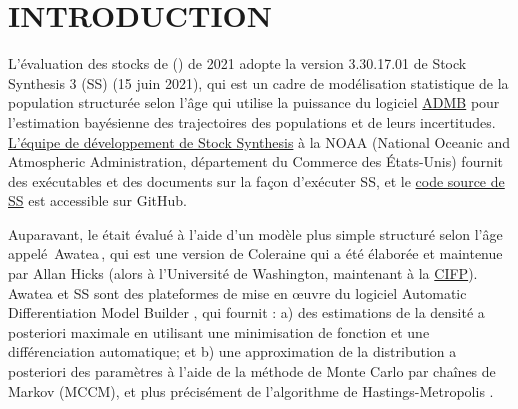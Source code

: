 \documentclass[11pt]{book}
\newcommand{\angL}{\guillemotleft\,}
\newcommand{\angR}{\,\guillemotright}
\begin{document}
\newcommand{\LH}{}%
\newcommand{\RH}{}%
\newcommand{\LF}{\spn{} 2021}
\newcommand{\RF}{Annexe~\thechapter ~-- \'{E}quations du mod\`{e}le}

\lhead{\LH}\rhead{\RH}\lfoot{\LF}\rfoot{\RF}

\newcommand{\nSims}{4\,000}
\newcommand{\nChains}{8}
\newcommand{\cSims}{500}
\newcommand{\cBurn}{250}
\newcommand{\cSamps}{250}
\newcommand{\Nmcmc}{2\,000}
\newcommand{\Nbase}{10\,000}

\newcommand{\numMCMC}{1\,000}
\newcommand{\sRate}{5\,000}
\newcommand{\nSamps}{1\,200}
\newcommand{\nBurn}{200}
\newcommand{\harvestMax}{0,401}
\newcommand{\harvestInc}{0,001}
\newcommand{\policyMax}{3\,000}
\newcommand{\policyInc}{500 (or 250)}
\newcommand{\currYear}{2022} %
\newcommand{\prevYear}{2021} %
\newcommand{\projYear}{2032} %

\section{INTRODUCTION}%

L'\'{e}valuation des stocks de \spn{} (\spc) de 2021 adopte la version 3.30.17.01 de Stock Synthesis 3 (SS) (15 juin 2021), qui est un cadre de mod\'{e}lisation statistique de la population structur\'{e}e selon l'\^{a}ge \citep{Methot-Wetzel:2013} qui utilise la puissance du logiciel \href{https://www.admb-project.org/}{ADMB} pour l'estimation bay\'{e}sienne des trajectoires des populations et de leurs incertitudes.
\href{https://vlab.noaa.gov/web/stock-synthesis}{L'\'{e}quipe de d\'{e}veloppement de Stock Synthesis} \`{a} la NOAA (National Oceanic and Atmospheric Administration, d\'{e}partement du Commerce des \'{E}tats-Unis) fournit des ex\'{e}cutables et des documents sur la fa\c{c}on d'ex\'{e}cuter SS, et le \href{https://github.com/nmfs-stock-synthesis/stock-synthesis}{code source de SS} est accessible sur GitHub.

Auparavant, le \spc{} \'{e}tait \'{e}valu\'{e} \`{a} l'aide d'un mod\`{e}le plus simple structur\'{e} selon l'\^{a}ge appel\'{e} \angL Awatea\angR{}, qui est une version de Coleraine \citep{Hilborn-etal:2003} qui a \'{e}t\'{e} \'{e}labor\'{e}e et maintenue par Allan Hicks (alors \`{a} l'Universit\'{e} de Washington, maintenant \`{a} la \href{https://www.iphc.int/}{CIFP}).
Awatea et SS sont des plateformes de mise en {\oe}uvre du logiciel Automatic Differentiation Model Builder \citep{ADMB:2009}, qui fournit : a) des estimations de la densit\'{e} a posteriori maximale en utilisant une minimisation de fonction et une diff\'{e}renciation automatique; et b) une approximation de la distribution a posteriori des param\`{e}tres \`{a} l'aide de la m\'{e}thode de Monte Carlo par cha\^{i}nes de Markov (MCCM), et plus pr\'{e}cis\'{e}ment de l'algorithme de Hastings-Metropolis \citep{Gelman-etal:2004}.
\end{document}
